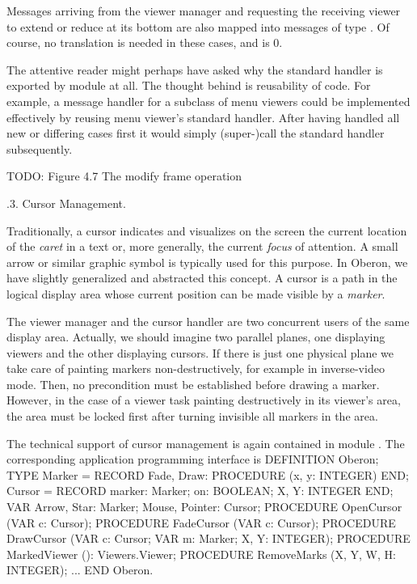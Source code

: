 Messages arriving from the viewer manager and requesting the receiving
viewer to extend or reduce at its bottom are also mapped into messages
of type . Of course, no translation is needed in these cases,
and  is 0.

The attentive reader might perhaps have asked why the standard handler
is exported by module  at all. The thought behind is
reusability of code. For example, a message handler for a subclass of
menu viewers could be implemented effectively by reusing menu viewer's
standard handler. After having handled all new or differing cases
first it would simply (super-)call the standard handler subsequently.

TODO: Figure 4.7 The modify frame operation

.3. Cursor Management.

Traditionally, a cursor indicates and visualizes on the screen the
current location of the \emph{caret} in a text or, more generally, the
current \emph{focus} of attention. A small arrow or similar graphic symbol is
typically used for this purpose. In Oberon, we have slightly
generalized and abstracted this concept. A cursor is a path in the
logical display area whose current position can be made visible by a
\emph{marker}.

The viewer manager and the cursor handler are two concurrent users of
the same display area. Actually, we should imagine two parallel
planes, one displaying viewers and the other displaying cursors. If
there is just one physical plane we take care of painting markers
non-destructively, for example in inverse-video mode. Then, no
precondition must be established before drawing a marker. However, in
the case of a viewer task painting destructively in its viewer's area,
the area must be locked first after turning invisible all markers in
the area.

The technical support of cursor management is again contained in
module . The corresponding application programming interface is
\begintt
DEFINITION Oberon;
  TYPE Marker = RECORD
      Fade, Draw: PROCEDURE (x, y: INTEGER)
    END;
    Cursor = RECORD
      marker: Marker;
      on: BOOLEAN;
      X, Y: INTEGER
    END;
  VAR Arrow, Star: Marker;
      Mouse, Pointer: Cursor;
  PROCEDURE OpenCursor (VAR c: Cursor);
  PROCEDURE FadeCursor (VAR c: Cursor);
  PROCEDURE DrawCursor (VAR c: Cursor; VAR m: Marker; X, Y: INTEGER);
  PROCEDURE MarkedViewer (): Viewers.Viewer;
  PROCEDURE RemoveMarks (X, Y, W, H: INTEGER);
  ...
END Oberon.
\endtt

